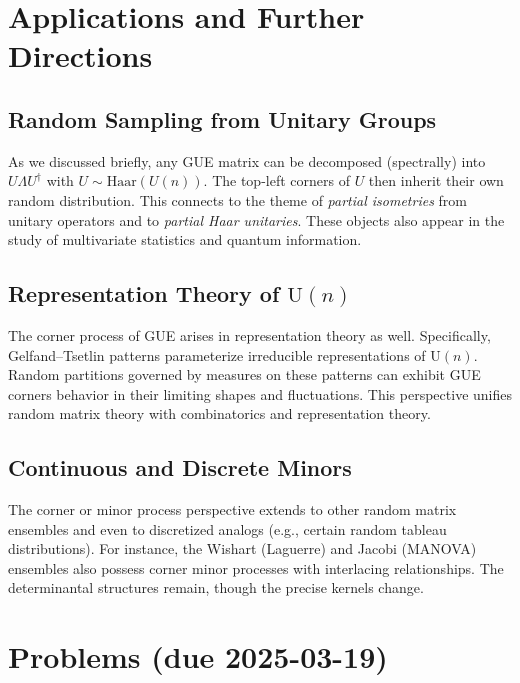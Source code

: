 \documentclass[letterpaper,11pt,oneside,reqno]{article}
\numberwithin{equation}{section}
\theoremstyle{definition}
\begin{document}
\section{Applications and Further Directions}

\subsection{Random Sampling from Unitary Groups}

As we discussed briefly, any GUE matrix can be decomposed (spectrally) into \(U \Lambda U^\dagger\) with \(U\sim \mathrm{Haar}(U(n))\). The top-left corners of \(U\) then inherit their own random distribution. This connects to the theme of \emph{partial isometries} from unitary operators and to \emph{partial Haar unitaries}. These objects also appear in the study of multivariate statistics and quantum information.

\subsection{Representation Theory of \texorpdfstring{\(\mathrm{U}(n)\)}{}}

The corner process of GUE arises in representation theory as well. Specifically, Gelfand--Tsetlin patterns parameterize irreducible representations of \(\mathrm{U}(n)\). Random partitions governed by measures on these patterns can exhibit GUE corners behavior in their limiting shapes and fluctuations. This perspective unifies random matrix theory with combinatorics and representation theory.

\subsection{Continuous and Discrete Minors}

The corner or minor process perspective extends to other random matrix ensembles and even to discretized analogs (e.g., certain random tableau distributions). For instance, the Wishart (Laguerre) and Jacobi (MANOVA) ensembles also possess corner minor processes with interlacing relationships. The determinantal structures remain, though the precise kernels change.

\section{Problems (due 2025-03-19)}
\end{document}
